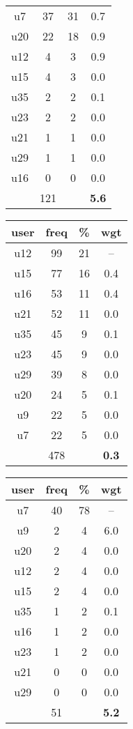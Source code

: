 \begin{appendices}
\begin{table}
\begin{tabular}{ |c|c|c|c| }
	u7 & 37 & 31 & 0.7 \\
	u20 & 22 & 18 & 0.9 \\
	u12 & 4 & 3 & 0.9 \\
	u15 & 4 & 3 & 0.0 \\
	u35 & 2 & 2 & 0.1 \\
	u23 & 2 & 2 & 0.0 \\
	u21 & 1 & 1 & 0.0 \\
	u29 & 1 & 1 & 0.0 \\
	u16 & 0 & 0 & 0.0 \\
	 & 121 & & \textbf{5.6} \\
	\hline
\end{tabular}
\begin{tabular}{ |c|c|c|c| }
	\hline
	\textbf{user} & \textbf{freq} & \textbf{\%} & \textbf{wgt} \\
	\hline
	u12 & 99 & 21 & -- \\
	u15 & 77 & 16 & 0.4 \\
	u16 & 53 & 11 & 0.4 \\
	u21 & 52 & 11 & 0.0 \\
	u35 & 45 & 9 & 0.1 \\
	u23 & 45 & 9 & 0.0 \\
	u29 & 39 & 8 & 0.0 \\
	u20 & 24 & 5 & 0.1 \\
	u9 & 22 & 5 & 0.0 \\
	u7 & 22 & 5 & 0.0 \\
	 & 478 & & \textbf{0.3} \\
	\hline
\end{tabular}
\begin{tabular}{ |c|c|c|c| }
	\hline
	\textbf{user} & \textbf{freq} & \textbf{\%} & \textbf{wgt} \\
	\hline
	u7 & 40 & 78 & -- \\
	u9 & 2 & 4 & 6.0 \\
	u20 & 2 & 4 & 0.0 \\
	u12 & 2 & 4 & 0.0 \\
	u15 & 2 & 4 & 0.0 \\
	u35 & 1 & 2 & 0.1 \\
	u16 & 1 & 2 & 0.0 \\
	u23 & 1 & 2 & 0.0 \\
	u21 & 0 & 0 & 0.0 \\
	u29 & 0 & 0 & 0.0 \\
	 & 51 & & \textbf{5.2} \\
	\hline

\end{tabular}
\end{table}
\end{appendices}
